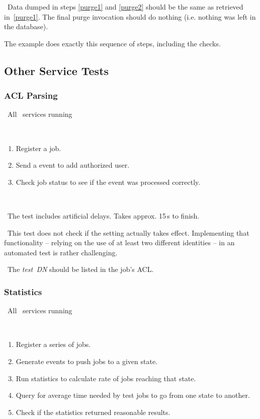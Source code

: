 \result\ Data dumped in steps \ref{purge1} and \ref{purge2} should be the
same as retrieved in~\ref{purge1}. The final purge invocation should
do nothing (i.e. nothing was left in the database).

\begin{hints}
The example  does exactly this sequence of steps,
including the checks.
\end{hints}

\subsection{Other Service Tests}

\subsubsection{ACL Parsing}

\req\ All \LB\ services running

\what\
\begin{enumerate}
\item Register a job.
\item Send a  event to add authorized user.
\item Check job status to see if the event was processed correctly.
\end{enumerate}

\how\ 

\note\ The test includes artificial delays. Takes approx. 15\,s to finish.

\note\ This test does not check if the setting actually takes effect. Implementing that functionality -- relying on the use of at least two different identities -- in an automated test is rather challenging. 

\result\ The \emph{test~DN} should be listed in the job's ACL.

\subsubsection{Statistics}

\req\ All \LB\ services running

\what\
\begin{enumerate}
\item Register a series of jobs.
\item Generate events to push jobs to a given state.
\item Run statistics to calculate rate of jobs reaching that state. 
\item Query for average time needed by test jobs to go from one state to another.
\item Check if the statistics returned reasonable results. 
\end{enumerate}

